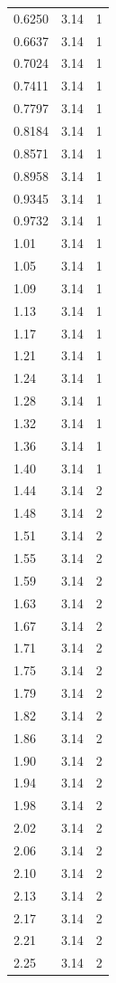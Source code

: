 \begin{longtable}{lrr}
  0.6250 & 3.14 & 1 \\
  0.6637 & 3.14 & 1 \\
  0.7024 & 3.14 & 1 \\
  0.7411 & 3.14 & 1 \\
  0.7797 & 3.14 & 1 \\
  0.8184 & 3.14 & 1 \\
  0.8571 & 3.14 & 1 \\
  0.8958 & 3.14 & 1 \\
  0.9345 & 3.14 & 1 \\
  0.9732 & 3.14 & 1 \\
  1.01 & 3.14 & 1 \\
  1.05 & 3.14 & 1 \\
  1.09 & 3.14 & 1 \\
  1.13 & 3.14 & 1 \\
  1.17 & 3.14 & 1 \\
  1.21 & 3.14 & 1 \\
  1.24 & 3.14 & 1 \\
  1.28 & 3.14 & 1 \\
  1.32 & 3.14 & 1 \\
  1.36 & 3.14 & 1 \\
  1.40 & 3.14 & 1 \\
  1.44 & 3.14 & 2 \\
  1.48 & 3.14 & 2 \\
  1.51 & 3.14 & 2 \\
  1.55 & 3.14 & 2 \\
  1.59 & 3.14 & 2 \\
  1.63 & 3.14 & 2 \\
  1.67 & 3.14 & 2 \\
  1.71 & 3.14 & 2 \\
  1.75 & 3.14 & 2 \\
  1.79 & 3.14 & 2 \\
  1.82 & 3.14 & 2 \\
  1.86 & 3.14 & 2 \\
  1.90 & 3.14 & 2 \\
  1.94 & 3.14 & 2 \\
  1.98 & 3.14 & 2 \\
  2.02 & 3.14 & 2 \\
  2.06 & 3.14 & 2 \\
  2.10 & 3.14 & 2 \\
  2.13 & 3.14 & 2 \\
  2.17 & 3.14 & 2 \\
  2.21 & 3.14 & 2 \\
  2.25 & 3.14 & 2 \\

\end{longtable}
